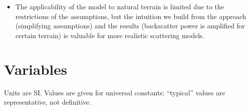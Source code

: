 \documentclass[11pt, oneside]{article}
\begin{document}
\begin{itemize}
	\item The applicability of the model to natural terrain is limited due to the restrictions of the assumptions, but the intuition we build from the approach (simplifying assumptions) and the results (backscatter power is amplified for certain terrain) is valuable for more realistic scattering models.
\end{itemize}

\clearpage
\section*{Variables}

Units are SI. Values are given for universal constants; ``typical'' values are representative, not definitive.
\end{document}
